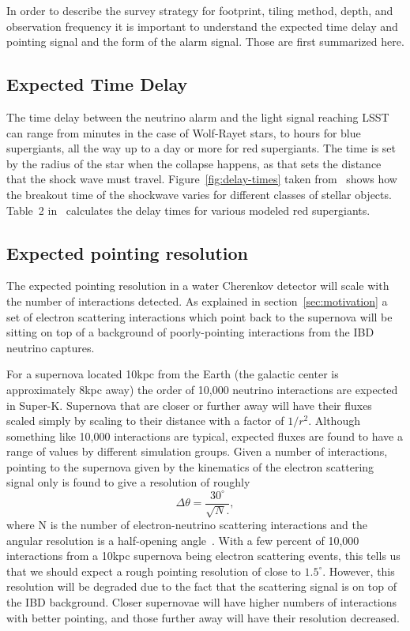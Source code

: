 \documentclass[11pt, letterpaper]{article}
\newcommand{\superk}  {Super\nobreakdash-K\xspace}
\begin{document}
In order to describe the survey strategy for footprint, tiling method,
depth, and observation frequency it is important to understand the
expected time delay and pointing signal and the form of the alarm
signal.  Those are first summarized here.

\subsection{Expected Time Delay}

The time delay between the neutrino alarm and the light signal
reaching LSST can range from minutes in the case of Wolf-Rayet stars,
to hours for blue supergiants, all the way up to a day or more for red
supergiants.  The time is set by the radius of the star when the
collapse happens, as that sets the distance that the shock wave must
travel.  Figure~\ref{fig:delay-times} taken
from~\cite{2013ApJ...778...81K} shows how the breakout time of the
shockwave varies for different classes of stellar objects. Table~2
in~\cite{2015ApJ...814...63M}  calculates the delay times for various
modeled red supergiants.

\subsection{Expected pointing resolution}

The expected pointing resolution in a water Cherenkov detector will
scale with the number of interactions detected.  As explained in
section~\ref{sec:motivation} a set of electron scattering interactions which
point back to the supernova will be sitting on top of a background of
poorly-pointing interactions from the IBD neutrino captures.

For a supernova located 10kpc from the Earth (the galactic center is
approximately 8kpc away) the order of 10,000 neutrino interactions are
expected in \superk.  Supernova that are closer or further away will
have their fluxes scaled simply by scaling to their distance with a
factor of $1/r^2$.  Although something like 10,000 interactions are
typical, expected fluxes are found to have a range of values by
different simulation groups.  Given a number of interactions, pointing
to the supernova given by the kinematics of the electron scattering
signal only is found to give a resolution of roughly
%
$$ \Delta \theta = \frac{30^\circ}{\sqrt{N}.}, $$
%
where N is the number of electron-neutrino scattering interactions and
the angular resolution is a half-opening
angle~\cite{2012ARNPS..62...81S}.  With a few percent of 10,000
interactions from a 10kpc supernova being electron scattering events,
this tells us that we should expect a rough pointing resolution of
close to $1.5^\circ$.   However, this resolution will be degraded
due to the fact that the scattering signal is on top of the IBD
background. Closer supernovae will have higher numbers of
interactions with better pointing, and those further away will have
their resolution decreased.
\end{document}
